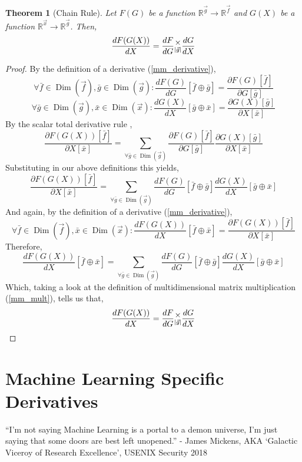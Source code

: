 \documentclass[12pt]{book}
\theoremstyle{plain}
\newtheorem{theorem}{Theorem}[chapter]
\theoremstyle{definition}
\theoremstyle{ppart}
\theoremstyle{case}
\theoremstyle{solution}
\DeclareMathOperator{\Dim}{Dim}
\newcommand{\mmult}[1]{\text{\raisebox{1ex}{$\underset{#1}{\times}$}}}
\begin{document}
\begin{theorem}[Chain Rule]
\label{mmm_chain_rule}
Let $F(G)$ be a function $\mathbb{R}^{\vec{g}} \rightarrow \mathbb{R}^{\vec{f}}$
and $G(X)$ be a function $\mathbb{R}^{\vec{x}} \rightarrow \mathbb{R}^{\vec{g}}$.
Then,
\[
\frac{dF(G(X))}{dX} = \frac{dF}{dG} \mmult{|\vec{g}|} \frac{dG}{dX}
\]
\end{theorem}
\begin{proof}
By the definition of a derivative (\ref{mm_derivative}),
\[
\forall \bar{f} \in \Dim(\vec{f}), \bar{g} \in \Dim(\vec{g}):
\frac{dF(G)}{dG}[\bar{f} \oplus \bar{g}]
= \frac{\partial F(G)[\bar{f}]}{\partial G[\bar{g}]}
\]
\[
\forall \bar{g} \in \Dim(\vec{g}), \bar{x} \in \Dim(\vec{x}):
\frac{dG(X)}{dX}[\bar{g} \oplus \bar{x}]
= \frac{\partial G(X)[\bar{g}]}{\partial X[\bar{x}]}
\]
By the scalar total derivative rule \cite{wiki:totalderiv},
\[
\frac{\partial F(G(X))[\bar{f}]}{\partial X[\bar{x}]}
= \sum_{\forall \bar{g} \in \Dim(\vec{g})} 
\frac{\partial F(G)[\bar{f}]}{\partial G[\bar{g}]}
\frac{\partial G(X)[\bar{g}]}{\partial X[\bar{x}]}
\]
Substituting in our above definitions this yields,
\[
\frac{\partial F(G(X))[\bar{f}]}{\partial X[\bar{x}]}
= \sum_{\forall \bar{g} \in \Dim(\vec{g})} 
\frac{dF(G)}{dG}[\bar{f} \oplus \bar{g}]
\frac{dG(X)}{dX}[\bar{g} \oplus \bar{x}]
\]
And again, by the definition of a derivative (\ref{mm_derivative}),
\[
\forall \bar{f} \in \Dim(\vec{f}), \bar{x} \in \Dim(\vec{x}):
\frac{dF(G(X))}{dX}[\bar{f} \oplus \bar{x}]
= \frac{\partial F(G(X))[\bar{f}]}{\partial X[\bar{x}]}
\]
Therefore,
\[
\frac{dF(G(X))}{dX}[\bar{f} \oplus \bar{x}]
= \sum_{\forall \bar{g} \in \Dim(\vec{g})} 
\frac{dF(G)}{dG}[\bar{f} \oplus \bar{g}]
\frac{dG(X)}{dX}[\bar{g} \oplus \bar{x}]
\]
Which, taking a look at the definition of multidimensional matrix multiplication
(\ref{mm_mult}), tells us that,
\[
\frac{dF(G(X))}{dX} = \frac{dF}{dG} \mmult{|\vec{g}|} \frac{dG}{dX}
\]
\end{proof}

\chapter{Machine Learning Specific Derivatives}

\begin{displayquote}
``I'm not saying Machine Learning is a portal to a demon universe, I'm just saying
that some doors are best left unopened.'' - James Mickens, AKA `Galactic Viceroy of Research Excellence', USENIX Security 2018
\end{displayquote}
\end{document}
